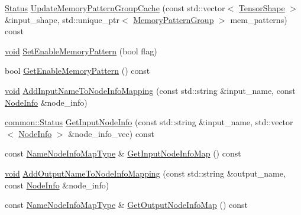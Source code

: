 \begin{DoxyCompactItemize}
\item 
\mbox{\hyperlink{classonnxruntime_1_1common_1_1Status}{Status}} \mbox{\hyperlink{classonnxruntime_1_1SessionState_a6309738563fcb395bfc41be309308829}{Update\+Memory\+Pattern\+Group\+Cache}} (const std\+::vector$<$ \mbox{\hyperlink{classonnxruntime_1_1TensorShape}{Tensor\+Shape}} $>$ \&input\+\_\+shape, std\+::unique\+\_\+ptr$<$ \mbox{\hyperlink{structonnxruntime_1_1MemoryPatternGroup}{Memory\+Pattern\+Group}} $>$ mem\+\_\+patterns) const
\item 
\mbox{\hyperlink{mlasi_8h_a88f941d423cb2a819b70a1358982b1a6}{void}} \mbox{\hyperlink{classonnxruntime_1_1SessionState_af01f42ff9a4cbb027a914179e5d7a8b8}{Set\+Enable\+Memory\+Pattern}} (bool flag)
\item 
bool \mbox{\hyperlink{classonnxruntime_1_1SessionState_a334b886b13b3954edf9d85d2dbbbabb5}{Get\+Enable\+Memory\+Pattern}} () const
\item 
\mbox{\hyperlink{mlasi_8h_a88f941d423cb2a819b70a1358982b1a6}{void}} \mbox{\hyperlink{classonnxruntime_1_1SessionState_a722e9a0c30eb23911c75019157d2a156}{Add\+Input\+Name\+To\+Node\+Info\+Mapping}} (const std\+::string \&input\+\_\+name, const \mbox{\hyperlink{structonnxruntime_1_1SessionState_1_1NodeInfo}{Node\+Info}} \&node\+\_\+info)
\item 
\mbox{\hyperlink{classonnxruntime_1_1common_1_1Status}{common\+::\+Status}} \mbox{\hyperlink{classonnxruntime_1_1SessionState_a6764e725a348073622544a4b98332078}{Get\+Input\+Node\+Info}} (const std\+::string \&input\+\_\+name, std\+::vector$<$ \mbox{\hyperlink{structonnxruntime_1_1SessionState_1_1NodeInfo}{Node\+Info}} $>$ \&node\+\_\+info\+\_\+vec) const
\item 
const \mbox{\hyperlink{classonnxruntime_1_1SessionState_ae235b8dfb073b021d014a42b5dcc0072}{Name\+Node\+Info\+Map\+Type}} \& \mbox{\hyperlink{classonnxruntime_1_1SessionState_a09f916e75db7903d8a0da8d6a78acc50}{Get\+Input\+Node\+Info\+Map}} () const
\item 
\mbox{\hyperlink{mlasi_8h_a88f941d423cb2a819b70a1358982b1a6}{void}} \mbox{\hyperlink{classonnxruntime_1_1SessionState_a7f263156b095ec3edb1d5956adc4903d}{Add\+Output\+Name\+To\+Node\+Info\+Mapping}} (const std\+::string \&output\+\_\+name, const \mbox{\hyperlink{structonnxruntime_1_1SessionState_1_1NodeInfo}{Node\+Info}} \&node\+\_\+info)
\item 
const \mbox{\hyperlink{classonnxruntime_1_1SessionState_ae235b8dfb073b021d014a42b5dcc0072}{Name\+Node\+Info\+Map\+Type}} \& \mbox{\hyperlink{classonnxruntime_1_1SessionState_a34f2a0e597991542cfadf0668b42b086}{Get\+Output\+Node\+Info\+Map}} () const

\end{DoxyCompactItemize}

